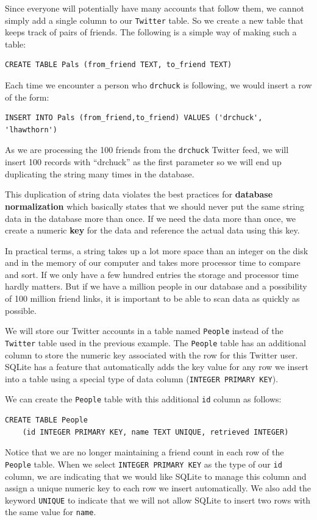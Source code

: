 \documentclass[10pt]{book}
\begin{document}
Since everyone will potentially have many accounts that follow
them, we cannot simply add a single column to our {\tt Twitter} table. 
So we create a new table that keeps track of pairs of friends.
The following is a simple way of making such a table:

\beforeverb
\begin{verbatim}
CREATE TABLE Pals (from_friend TEXT, to_friend TEXT)
\end{verbatim}
\afterverb
%
Each time we encounter a person who {\tt drchuck} is following, we
would insert a row of the form:

\beforeverb
\begin{verbatim}
INSERT INTO Pals (from_friend,to_friend) VALUES ('drchuck', 'lhawthorn')
\end{verbatim}
\afterverb
%
As we are processing the 100 friends from the {\tt drchuck}
Twitter feed, we will insert 100 records with ``drchuck''
as the first parameter so we will end up duplicating the 
string many times in the database.

This duplication of string data violates the best practices 
for {\bf database normalization} which basically states that
we should never put the same string data in the database more than once.  
If we need the data more than once, we create a 
numeric {\bf key} for the data and reference the actual data 
using this key.

In practical terms, a string takes up a lot more 
space than an integer on the disk
and in the memory of our computer and takes more processor time
to compare and sort.  If we only have a few hundred entries 
the storage and processor time hardly matters.  But if we have 
a million people in our database and a possibility of 100 million
friend links, it is important to be able to scan data as quickly
as possible.

We will store our Twitter accounts in a table named {\tt People}
instead of the {\tt Twitter} table used in the previous example.
The {\tt People} table has an additional column 
to store the numeric key associated with the 
row for this Twitter user.   
SQLite has a feature that automatically adds the key value
for any row we insert into a table using a special type of 
data column ({\tt INTEGER PRIMARY KEY}).

We can create the {\tt People} table with this additional 
{\tt id} column as follows:

\beforeverb
\begin{verbatim}
CREATE TABLE People 
    (id INTEGER PRIMARY KEY, name TEXT UNIQUE, retrieved INTEGER)
\end{verbatim}
\afterverb
%
Notice that we are no longer maintaining a friend count in each row
of the {\tt People} table.
When we select {\tt INTEGER PRIMARY KEY} as the type of our {\tt id} column,
we are indicating that we would like SQLite to manage this column and 
assign a unique numeric key to each row we insert automatically.
We also add the keyword {\tt UNIQUE} to indicate that we will not 
allow SQLite to insert two rows with the same value for {\tt name}.
\end{document}
